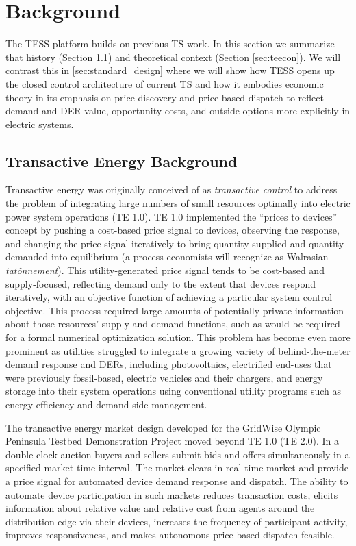 \section{Background}\label{sec:background}

The TESS platform builds on previous TS work. In this section we summarize that history (Section \ref{sec:tehistory}) and theoretical context (Section \ref{sec:teecon}).
We will contrast this in \cref{sec:standard_design} where we will show how TESS opens up the closed control architecture of current TS and how it embodies economic theory in its emphasis on price discovery and price-based dispatch to reflect demand and DER value, opportunity costs, and outside options more explicitly in electric systems.

\subsection{Transactive Energy Background}\label{sec:tehistory} 

Transactive energy was originally conceived of as \emph{transactive control} to address the problem of integrating large numbers of small resources optimally into electric power system operations (TE 1.0).
TE 1.0 implemented the ``prices to devices'' concept by pushing a cost-based price signal to devices, observing the response, and changing the price signal iteratively to bring quantity supplied and quantity demanded into equilibrium (a process economists will recognize as Walrasian \emph{tat\^{o}nnement}). This utility-generated price signal tends to be cost-based and supply-focused, reflecting demand only to the extent that devices respond iteratively, with an objective function of achieving a particular system control objective.
This process required large amounts of potentially private information about those resources' supply and demand functions, such as would be required for a formal numerical optimization solution.  This problem has become even more prominent as utilities struggled to integrate a growing variety of behind-the-meter demand response and DERs, including photovoltaics, electrified end-uses that were previously fossil-based, electric vehicles and their chargers, and energy storage into their system operations using conventional utility programs such as energy efficiency and demand-side-management. 

The transactive energy market design developed for the GridWise Olympic Peninsula Testbed Demonstration Project \citep{hammerstrom_2008} moved beyond TE 1.0 (TE 2.0). In a double clock auction buyers and sellers submit bids and offers simultaneously in a specified market time interval. 
The market clears in real-time market and provide a price signal for automated device demand response and dispatch.
The ability to automate device participation in such markets reduces transaction costs, elicits information about relative value and relative cost from agents around the distribution edge via their devices, increases the frequency of participant activity, improves responsiveness, and makes autonomous price-based dispatch feasible. 

